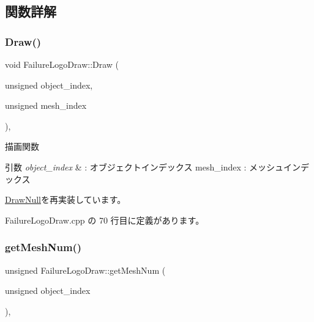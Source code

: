 \subsection{関数詳解}
\mbox{\label{class_failure_logo_draw_a8ee20e1697bbbaf7f41c18334830488a}} 
\subsubsection{\texorpdfstring{Draw()}{Draw()}}
{\footnotesize\ttfamily void Failure\+Logo\+Draw\+::\+Draw (\begin{DoxyParamCaption}\item[{unsigned}]{object\+\_\+index,  }\item[{unsigned}]{mesh\+\_\+index }\end{DoxyParamCaption})\hspace{0.3cm}{\ttfamily [override]}, {\ttfamily [virtual]}}



描画関数 


\begin{DoxyParams}{引数}
{\em object\+\_\+index} & \+: オブジェクトインデックス mesh\+\_\+index \+: メッシュインデックス \\
\hline
\end{DoxyParams}


\mbox{\hyperlink{class_draw_null_afe50f6fd820b18d673f70f048743f339}{Draw\+Null}}を再実装しています。



 Failure\+Logo\+Draw.\+cpp の 70 行目に定義があります。

\mbox{\label{class_failure_logo_draw_a45bb5d0965ca73b06ae0836f27f9b0e3}} 
\subsubsection{\texorpdfstring{get\+Mesh\+Num()}{getMeshNum()}}
{\footnotesize\ttfamily unsigned Failure\+Logo\+Draw\+::get\+Mesh\+Num (\begin{DoxyParamCaption}\item[{unsigned}]{object\+\_\+index }\end{DoxyParamCaption})\hspace{0.3cm}{\ttfamily [override]}, {\ttfamily [virtual]}}



